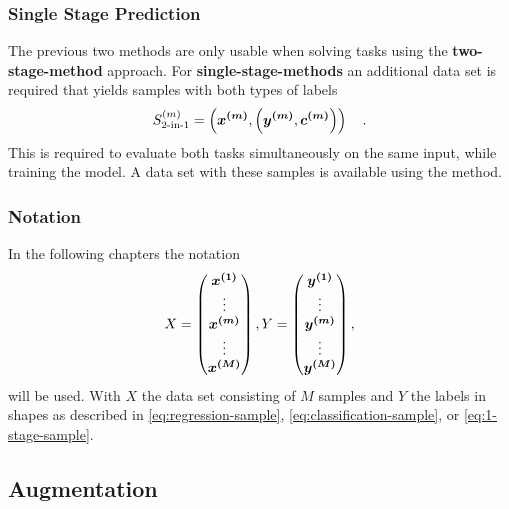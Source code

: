 \subsubsection{Single Stage Prediction}
The previous two methods are only usable when solving tasks using the \textbf{two-stage-method} approach.
For \textbf{single-stage-methods} an additional data set is required that yields samples with both types of labels
\begin{align}
    S^{(m)}_{\text{2-in-1}} = \left(\bm{x^{(m)}}, \left(\bm{y^{(m)}}, \bm{c^{(m)}}\right)\right)\quad .
    \label{eq:1-stage-sample}
\end{align}
This is required to evaluate both tasks simultaneously on the same input, while training the model.
A data set with these samples is available using the  method.
\subsubsection{Notation}
In the following chapters the notation
\begin{align}
    X =
    \begin{pmatrix}
        \bm{x^{(1)}}\\
        \vdots\\
        \bm{x^{(m)}}\\
        \vdots\\
        \bm{x^{(M)}}
    \end{pmatrix},
    Y =
    \begin{pmatrix}
        \bm{y^{(1)}}\\
        \vdots\\
        \bm{y^{(m)}}\\
        \vdots\\
        \bm{y^{(M)}}
    \end{pmatrix},
    \label{eq:dataset}
\end{align}
will be used.
With $X$ the data set consisting of $M$ samples and $Y$ the labels in shapes as described in \eqref{eq:regression-sample}, \eqref{eq:classification-sample}, or \eqref{eq:1-stage-sample}.
\subsection{Augmentation}\label{subsec:augmentation}

